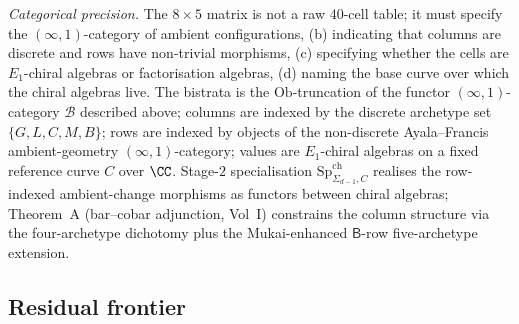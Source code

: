 \begin{theorem}
\emph{Categorical precision.} The $8 \times 5$ matrix is not a raw
$40$-cell table; it must specify
the $(\infty, 1)$-category of ambient configurations, (b) indicating
that columns are discrete and rows have non-trivial morphisms, (c)
specifying whether the cells are $E_1$-chiral algebras or factorisation
algebras, (d) naming the base curve over which the chiral algebras
live.  The bistrata is the $\mathrm{Ob}$-truncation of the
functor $(\infty, 1)$-category $\mathcal{B}$ described above; columns
are indexed by the discrete archetype set $\{G, L, C, M, B\}$;
rows are indexed by objects of the non-discrete Ayala--Francis
ambient-geometry $(\infty, 1)$-category; values are $E_1$-chiral
algebras on a fixed reference curve $C$ over $\CC$. Stage-$2$
specialisation $\mathrm{Sp}^{\mathrm{ch}}_{\Sigma_{d-1}, C}$ realises
the row-indexed ambient-change morphisms as functors between chiral
algebras; Theorem~A (bar--cobar adjunction, Vol~I) constrains the
column structure via the four-archetype dichotomy plus the
Mukai-enhanced $\mathsf{B}$-row five-archetype extension.
\end{theorem}

\subsection{Residual frontier}
\label{wn:subsec:third-pass-frontier}


